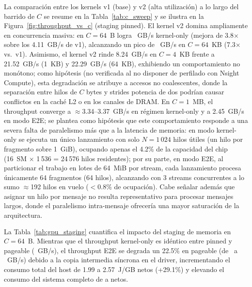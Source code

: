 \documentclass[conference]{IEEEtran}
\begin{document}
La comparación entre los kernels v1 (base) y v2 (alta utilización) a lo largo del barrido de $C$ se resume en la Tabla~\ref{tab:c_sweep} y se ilustra en la Figura~\ref{fig:throughput_vs_c} (staging pinned). El kernel v2 domina ampliamente en concurrencia masiva: en $C=64$~B logra \macrogputputkernel~GB/s kernel-only (mejora de 3.8$\times$ sobre los 4.11~GB/s de v1), alcanzando un pico de \macrogpupeakkernel~GB/s en $C=64$~KB (7.3$\times$ vs.~v1). Asimismo, el kernel v2 rinde 8.24~GB/s en $C=4$~KB frente a 21.52~GB/s (1~KB) y 22.29~GB/s (64~KB), exhibiendo un comportamiento no monótono; como hipótesis (no verificada al no disponer de perfilado con Nsight Compute), esta degradación se atribuye a accesos no coalescentes, donde la separación entre hilos de $C$ bytes y strides potencia de dos podrían causar conflictos en la caché L2 o en los canales de DRAM. En $C=1$~MB, el throughput converge a $\approx$3.34--3.37~GB/s en régimen kernel-only y a 2.45~GB/s en modo E2E; se plantea como hipótesis que este comportamiento responde a una severa falta de paralelismo más que a la latencia de memoria: en modo kernel-only se ejecuta un único lanzamiento con solo $N=1\,024$ hilos útiles (un hilo por fragmento sobre 1~GiB), ocupando apenas el 4.2\% de la capacidad del chip (16~SM $\times$ 1\,536 = 24\,576 hilos residentes); por su parte, en modo E2E, al particionar el trabajo en lotes de 64~MiB por stream, cada lanzamiento procesa únicamente 64 fragmentos (64 hilos), alcanzando con 3 streams concurrentes a lo sumo $\approx$192 hilos en vuelo ($<0.8\%$ de ocupación). Cabe señalar además que asignar un hilo por mensaje no resulta representativo para procesar mensajes largos, donde el paralelismo intra-mensaje ofrecería una mayor saturación de la arquitectura.



La Tabla~\ref{tab:gpu_staging} cuantifica el impacto del staging de memoria en $C=64$~B. Mientras que el throughput kernel-only es idéntico entre pinned y pageable (\macrogputputkernel~GB/s), el throughput E2E se degrada un 22.5\% en pageable (de \macrogputputeetwopinned~a \macrogputputeetwopageable~GB/s) debido a la copia intermedia síncrona en el driver, incrementando el consumo total del host de 1.99 a 2.57~J/GB netos (+29.1\%) y elevando el consumo del sistema completo de \macrogpuenergyeetwoconhosts{} a \macrogpuenergyeetwopageableconhosts{} netos.


\end{document}
